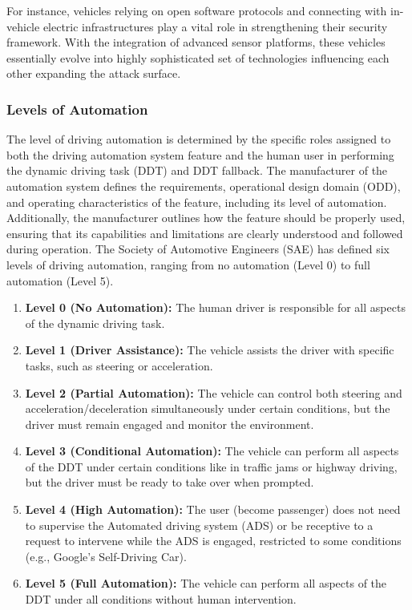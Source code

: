 For instance, vehicles relying on open software protocols and connecting with in-vehicle electric infrastructures play a vital role in strengthening their security framework.
With the integration of advanced sensor platforms, these vehicles essentially evolve into highly sophisticated set of technologies influencing each other expanding the attack surface\cite{sec-by-design}.


\subsubsection{Levels of Automation}\label{subsubsec:levels-of-automation}
The level of driving automation is determined by the specific roles assigned to both the driving automation system feature and the human user in performing the dynamic driving task (DDT) and DDT fallback\cite{sae_j3016_2021}.
The manufacturer of the automation system defines the requirements, operational design domain (ODD), and operating characteristics of the feature, including its level of automation.
Additionally, the manufacturer outlines how the feature should be properly used, ensuring that its capabilities and limitations are clearly understood and followed during operation.
The Society of Automotive Engineers (SAE) has defined six levels of driving automation, ranging from no automation (Level 0) to full automation (Level 5)\cite{sae_j3016_2021}.

\begin{enumerate}
    \item \textbf{Level 0 (No Automation):} The human driver is responsible for all aspects of the dynamic driving task.
    \item \textbf{Level 1 (Driver Assistance):} The vehicle assists the driver with specific tasks, such as steering or acceleration.
    \item \textbf{Level 2 (Partial Automation):} The vehicle can control both steering and acceleration/deceleration simultaneously under certain conditions, but the driver must remain engaged and monitor the environment.
    \item \textbf{Level 3 (Conditional Automation):} The vehicle can perform all aspects of the DDT under certain conditions like in traffic jams or highway driving, but the driver must be ready to take over when prompted.
    \item \textbf{Level 4 (High Automation):} The user (become passenger) does not need to supervise the Automated driving system (ADS) or be receptive to a request to intervene while the
    ADS is engaged, restricted to some conditions (e.g., Google's Self-Driving Car\cite{teoh2017rage}).
    \item \textbf{Level 5 (Full Automation):} The vehicle can perform all aspects of the DDT under all conditions without human intervention.
\end{enumerate}

